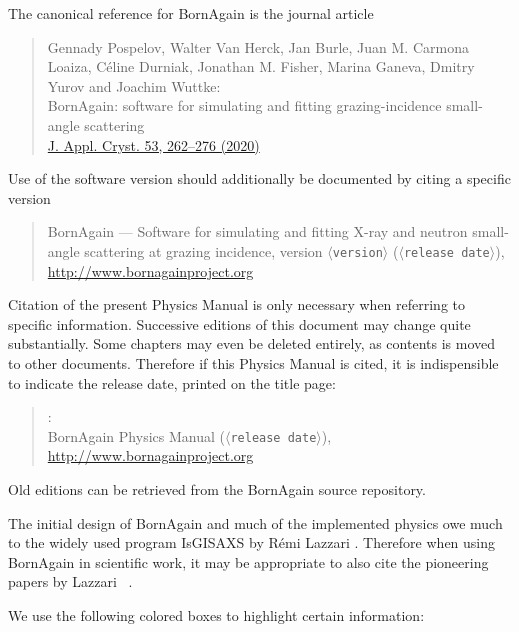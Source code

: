 %
The canonical reference for BornAgain is the journal article \cite{PoVB20}
\begin{quote}
Gennady Pospelov, Walter Van Herck, Jan Burle, Juan M. Carmona Loaiza,
Céline Durniak, Jonathan M. Fisher, Marina Ganeva, Dmitry Yurov and
Joachim Wuttke:\\
BornAgain: software for simulating and fitting
grazing-incidence small-angle scattering\\
\href{https://doi.org/10.1107/S1600576719016789}{J. Appl. Cryst. 53, 262–276 (2020)}
\end{quote}
Use of the software version should additionally be documented by citing a specific version
\begin{quote}
BornAgain --- Software for simulating and fitting
X-ray and neutron small-angle scattering at grazing incidence,
version $\langle$\texttt{version}$\rangle$ ($\langle$\texttt{release date}$\rangle$),\\
\url{http://www.bornagainproject.org}
\end{quote}
Citation of the present Physics Manual is only necessary
when referring to specific information.
Successive editions of this document may change quite substantially.
Some chapters may even be deleted entirely,
as contents is moved to other documents.
Therefore if this Physics Manual is cited,
it is indispensible to indicate the release date,
printed on the title page:
\begin{quote}
\authors:\\
BornAgain Physics Manual ($\langle$\texttt{release date}$\rangle$),\\
\url{http://www.bornagainproject.org}
\end{quote}
Old editions can be retrieved from the BornAgain source repository.

The initial design of BornAgain and much of the implemented physics owe much
to the widely used program IsGISAXS
%
%
by R\'emi Lazzari \cite{Laz06}.
Therefore when using BornAgain in scientific work,
it may be appropriate to also cite the pioneering papers
by Lazzari \etal\ \cite{Laz02,ReLL09}.



We use the following colored boxes to highlight
certain information:


